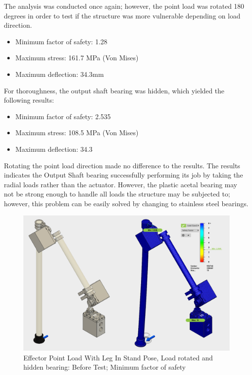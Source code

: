 The analysis was conducted once again; however, the point load was rotated 180 degrees in order to test if the structure was more vulnerable depending on load direction.
 \begin{itemize}
     \item Minimum factor of safety: 1.28
     \item Maximum stress: 161.7 MPa (Von Mises)
     \item Maximum deflection: 34.3mm
 \end{itemize}
 
For thoroughness, the output shaft bearing was hidden, which yielded the following results:
  \begin{itemize}
     \item Minimum factor of safety: 2.535
     \item Maximum stress: 108.5 MPa (Von Mises)
     \item Maximum deflection: 34.3
 \end{itemize}
 
Rotating the point load direction made no difference to the results. 
The results indicates the Output Shaft bearing successfully performing its job by taking the radial loads rather than the actuator. However, the plastic acetal bearing may not be strong enough to handle all loads the structure may be subjected to; however, this problem can be easily solved by changing to stainless steel bearings. 


 
\begin{figure}[h]
\centering
\includegraphics[width=1.0\columnwidth]{./img/aquaShoko-v3dot3-FEA-HidenBearing-1.png}
\caption{Effector Point Load With Leg In Stand Pose, Load rotated and hidden bearing: Before Test; Minimum factor of safety }
\label{fig:test two pressure check}
\end{figure}


